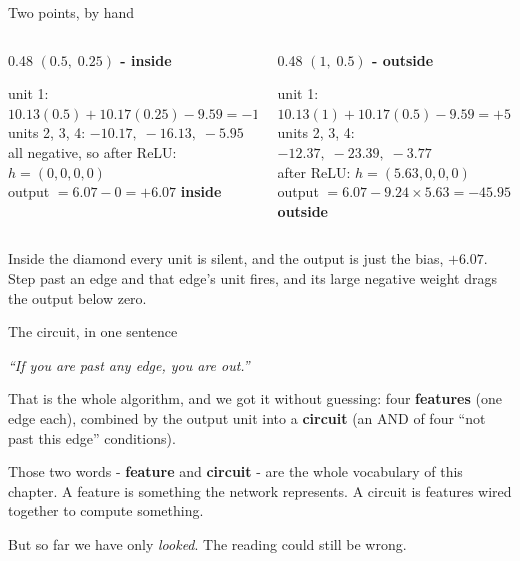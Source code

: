 \documentclass[aspectratio=169]{beamer}
\newcommand{\keybox}[1]{%
  \begin{tcolorbox}[colback=armblue!8, colframe=armblue, boxrule=0.6pt, arc=2pt]
  #1
  \end{tcolorbox}}
\newcommand{\takebox}[1]{%
  \begin{tcolorbox}[colback=paramgreen!8, colframe=paramgreen, boxrule=0.6pt, arc=2pt]
  #1
  \end{tcolorbox}}
\begin{document}
\begin{frame}{Two points, by hand}
  \vspace{0.3em}
  \begin{columns}[T]
    \begin{column}{0.48\textwidth}
      \textbf{$(0.5,\; 0.25)$ - inside}

      \vspace{0.4em}
      {\small
      unit 1: $10.13(0.5) + 10.17(0.25) - 9.59 = -1.98$\\
      units 2, 3, 4: $-10.17,\; -16.13,\; -5.95$\\[0.4em]
      all negative, so after ReLU: $h = (0, 0, 0, 0)$\\[0.4em]
      output $= 6.07 - 0 = \mathbf{+6.07}$ \hfill \textcolor{paramgreen}{\textbf{inside}}}
    \end{column}
    \begin{column}{0.48\textwidth}
      \textbf{$(1,\; 0.5)$ - outside}

      \vspace{0.4em}
      {\small
      unit 1: $10.13(1) + 10.17(0.5) - 9.59 = +5.63$\\
      units 2, 3, 4: $-12.37,\; -23.39,\; -3.77$\\[0.4em]
      after ReLU: $h = (5.63, 0, 0, 0)$\\[0.4em]
      output $= 6.07 - 9.24 \times 5.63 = \mathbf{-45.95}$ \hfill
      \textcolor{armred}{\textbf{outside}}}
    \end{column}
  \end{columns}

  \vspace{1.0em}
  \keybox{Inside the diamond every unit is silent, and the output is just the bias, $+6.07$. Step
  past an edge and that edge's unit fires, and its large negative weight drags the output below
  zero.}
\end{frame}

\begin{frame}{The circuit, in one sentence}
  \vspace{1.0em}
  \begin{center}
    {\Large \emph{``If you are past any edge, you are out.''}}
  \end{center}

  \vspace{1.1em}
  That is the whole algorithm, and we got it without guessing: four \textbf{features} (one edge
  each), combined by the output unit into a \textbf{circuit} (an AND of four ``not past this
  edge'' conditions).

  \vspace{0.9em}
  \takebox{Those two words - \textbf{feature} and \textbf{circuit} - are the whole vocabulary of
  this chapter. A feature is something the network represents. A circuit is features wired
  together to compute something.}

  \vspace{0.6em}
  {\small But so far we have only \emph{looked}. The reading could still be wrong.}
\end{frame}
\end{document}

